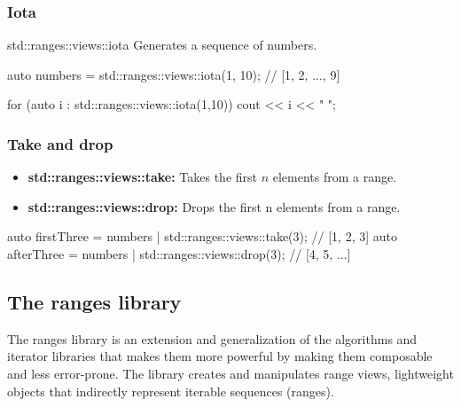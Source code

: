 \documentclass{report}
\begin{document}
         \bigbreak \noindent 
         \subsubsection{Iota}
         \bigbreak \noindent 
         std::ranges::views::iota Generates a sequence of numbers.
         \bigbreak \noindent 
         \begin{cppcode}
         auto numbers = std::ranges::views::iota(1, 10); // [1, 2, ..., 9]

         for (auto i : std::ranges::views::iota(1,10)) cout << i << " ";
         \end{cppcode}

         \bigbreak \noindent 
         \subsubsection{Take and drop}
         \bigbreak \noindent 
         \begin{itemize}
             \item \textbf{std::ranges::views::take:} Takes the first $n $ elements from a range.
            \item \textbf{std::ranges::views::drop:} Drops the first n elements from a range.
         \end{itemize}
         \bigbreak \noindent 
         \begin{cppcode}
             auto firstThree = numbers | std::ranges::views::take(3); // [1, 2, 3]
             auto afterThree = numbers | std::ranges::views::drop(3); // [4, 5, ...]
         \end{cppcode}

         \bigbreak \noindent 
         \subsection{The ranges library}
         \bigbreak \noindent 
         The ranges library is an extension and generalization of the algorithms and iterator libraries that makes them more powerful by making them composable and less error-prone.
         \bigbreak \noindent 
         The library creates and manipulates range views, lightweight objects that indirectly represent iterable sequences (ranges).
\end{document}
